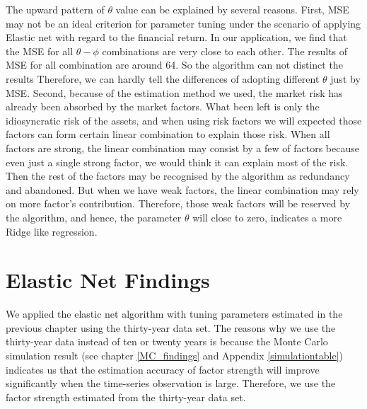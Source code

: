 The upward pattern of $\theta$ value can be explained by several reasons.
First, MSE may not be an ideal criterion for parameter tuning under the scenario of applying Elastic net with regard to the financial return. 
In our application, we find that the MSE for all $\theta - \phi$ combinations are very close to each other.
The results of MSE for all combination are around 64.
So the algorithm can not distinct the results 
Therefore, we can hardly tell the differences of adopting different $\theta$ just by MSE.
Second, because of the estimation method we used, the market risk has already been absorbed by the market factors.
What been left is only the idiosyncratic risk of the assets, and when using risk factors we will expected those factors can form certain linear combination to  explain those risk.
When all factors are strong, the linear combination may consist by a few of factors because even just a single strong factor, we would think it can explain most of the risk.
Then the rest of the factors may be recognised by the algorithm as redundancy and abandoned.
But when we have weak factors, the linear combination may rely on more factor's contribution.
Therefore, those weak factors will be reserved by the algorithm, and hence, the parameter $\theta$ will close to zero, indicates a more Ridge like regression.





\section{Elastic Net Findings}
We applied the elastic net algorithm with tuning parameters estimated in the previous chapter using the thirty-year data set.
The reasons why we use the thirty-year data instead of ten or twenty years is because the Monte Carlo simulation result (see chapter \ref{MC_findings} and Appendix \ref{simulationtable}) indicates us that the estimation accuracy of factor strength will improve significantly when the time-series observation is large.
Therefore, we use the factor strength estimated from the thirty-year data set.

